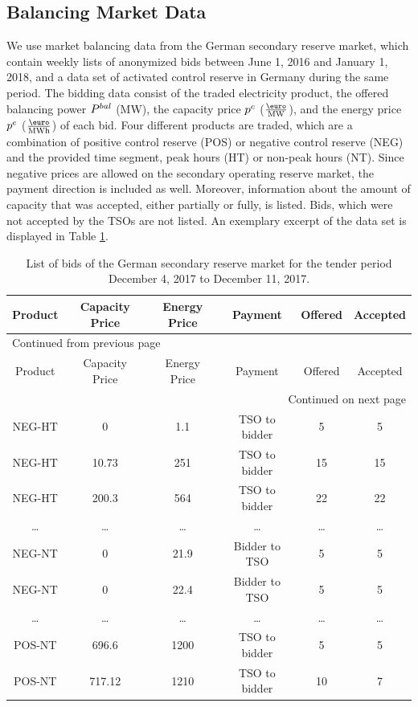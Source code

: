 \documentclass[a4paper, 12pt]{article}
\begin{document}
\subsection{Balancing Market Data \label{sec-data-balancing}}
\label{sec:orgd47fe53}
We use market balancing data from the German secondary reserve market, which
contain weekly lists of anonymized bids between June 1, 2016 and January 1,
2018, and a data set of activated control reserve in Germany during the same
period. The bidding data consist of the traded electricity product, the offered
balancing power \(P^{bal}_{}\) (MW), the capacity price \(p^c_{}\) (\(\emw\)), and the
energy price \(p^e_{}\) (\(\emwh\)) of each bid. Four different products are traded,
which are a combination of positive control reserve (POS) or negative control
reserve (NEG) and the provided time segment, peak hours (HT) or non-peak hours
(NT). Since negative prices are allowed on the secondary operating reserve
market, the payment direction is included as well. Moreover, information about
the amount of capacity that was accepted, either partially or fully, is listed.
Bids, which were not accepted by the TSOs are not listed. An exemplary excerpt
of the data set is displayed in Table \ref{table-operating-reserve}.



\begin{longtable}{c|ccccc}
\caption[Secondary Operating Reserve Market Data]{List of bids of the German secondary reserve market for the tender period December 4, 2017 to December 11, 2017. \label{table-operating-reserve}}
\\
\hline
\hline
Product & Capacity Price & Energy Price & Payment & Offered & Accepted\\
\hline
\endfirsthead
\multicolumn{6}{l}{Continued from previous page} \\
\hline

Product & Capacity Price & Energy Price & Payment & Offered & Accepted \\

\hline
\endhead
\hline\multicolumn{6}{r}{Continued on next page} \\
\endfoot
\endlastfoot
\hline
NEG-HT & 0 & 1.1 & TSO to bidder & 5 & 5\\
NEG-HT & 10.73 & 251 & TSO to bidder & 15 & 15\\
NEG-HT & 200.3 & 564 & TSO to bidder & 22 & 22\\
\ldots{} & \ldots{} & \ldots{} & \ldots{} & \ldots{} & \ldots{}\\
NEG-NT & 0 & 21.9 & Bidder to TSO & 5 & 5\\
NEG-NT & 0 & 22.4 & Bidder to TSO & 5 & 5\\
\ldots{} & \ldots{} & \ldots{} & \ldots{} & \ldots{} & \ldots{}\\
POS-NT & 696.6 & 1200 & TSO to bidder & 5 & 5\\
POS-NT & 717.12 & 1210 & TSO to bidder & 10 & 7\\
\hline
\hline
\end{longtable}
\end{document}
